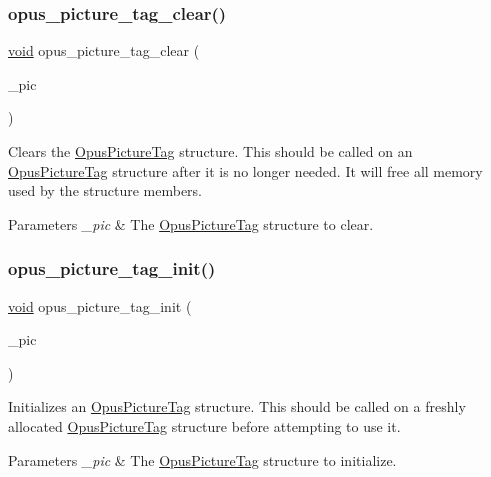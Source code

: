 \subsubsection{\texorpdfstring{opus\_picture\_tag\_clear()}{opus\_picture\_tag\_clear()}}
{\footnotesize\ttfamily \mbox{\hyperlink{_s_d_l__opengles2__gl2ext_8h_ae5d8fa23ad07c48bb609509eae494c95}{void}} opus\+\_\+picture\+\_\+tag\+\_\+clear (\begin{DoxyParamCaption}\item[{\mbox{\hyperlink{struct_opus_picture_tag}{Opus\+Picture\+Tag}} $\ast$}]{\+\_\+pic }\end{DoxyParamCaption})}

Clears the \mbox{\hyperlink{struct_opus_picture_tag}{Opus\+Picture\+Tag}} structure. This should be called on an \mbox{\hyperlink{struct_opus_picture_tag}{Opus\+Picture\+Tag}} structure after it is no longer needed. It will free all memory used by the structure members. 
\begin{DoxyParams}{Parameters}
{\em \+\_\+pic} & The \mbox{\hyperlink{struct_opus_picture_tag}{Opus\+Picture\+Tag}} structure to clear. \\
\hline
\end{DoxyParams}
\mbox{\label{group__header__info_ga09b9724bb7a9abd1d78680bd7d420ec2}} 
\subsubsection{\texorpdfstring{opus\_picture\_tag\_init()}{opus\_picture\_tag\_init()}}
{\footnotesize\ttfamily \mbox{\hyperlink{_s_d_l__opengles2__gl2ext_8h_ae5d8fa23ad07c48bb609509eae494c95}{void}} opus\+\_\+picture\+\_\+tag\+\_\+init (\begin{DoxyParamCaption}\item[{\mbox{\hyperlink{struct_opus_picture_tag}{Opus\+Picture\+Tag}} $\ast$}]{\+\_\+pic }\end{DoxyParamCaption})}

Initializes an \mbox{\hyperlink{struct_opus_picture_tag}{Opus\+Picture\+Tag}} structure. This should be called on a freshly allocated \mbox{\hyperlink{struct_opus_picture_tag}{Opus\+Picture\+Tag}} structure before attempting to use it. 
\begin{DoxyParams}{Parameters}
{\em \+\_\+pic} & The \mbox{\hyperlink{struct_opus_picture_tag}{Opus\+Picture\+Tag}} structure to initialize. \\
\hline
\end{DoxyParams}
\mbox{\label{group__header__info_ga6487af1d21fe87f4815567d85a27989a}} 
